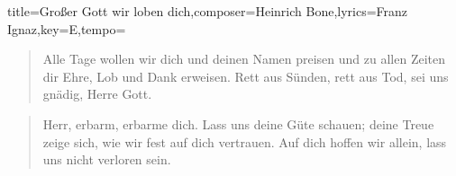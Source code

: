 \documentclass{leadsheet-modern}
\begin{document}
\begin{song}{title={Großer Gott wir loben dich},composer={Heinrich Bone},lyrics={Franz Ignaz},key={E},tempo={}}
\begin{verse}
Alle Tage wollen wir dich und deinen Namen preisen
und zu allen Zeiten dir Ehre, Lob und Dank erweisen.
Rett aus Sünden, rett aus Tod, sei uns gnädig, Herre Gott.
\end{verse}

\begin{verse}
Herr, erbarm, erbarme dich. Lass uns deine Güte schauen;
deine Treue zeige sich, wie wir fest auf dich vertrauen.
Auf dich hoffen wir allein, lass uns nicht verloren sein.
\end{verse}

\end{song}
\end{document}
